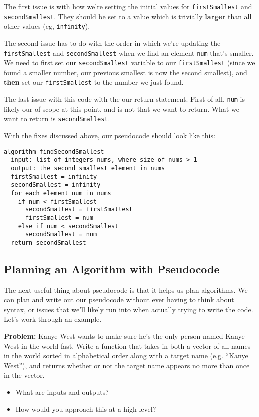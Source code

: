 \documentclass [12pt]{article}
\begin{document}
The first issue is with how we're setting the initial values for \texttt{firstSmallest} and \texttt{secondSmallest}. They should be set to a value which is trivially \textbf{larger} than all other values (eg, \texttt{infinity}).

The second issue has to do with the order in which we're updating the \texttt{firstSmallest} and \texttt{secondSmallest} when we find an element \texttt{num} that's smaller. We need to first set our \texttt{secondSmallest} variable to our \texttt{firstSmallest} (since we found a smaller number, our previous smallest is now the second smallest), and \textbf{then} set our \texttt{firstSmallest} to the number we just found.

The last issue with this code with the our return statement. First of all, \texttt{num} is likely our of scope at this point, and is not that we want to return. What we want to return is \texttt{secondSmallest}.

With the fixes discussed above, our pseudocode should look like this:

\begin{verbatim}
algorithm findSecondSmallest
  input: list of integers nums, where size of nums > 1
  output: the second smallest element in nums
  firstSmallest = infinity
  secondSmallest = infinity
  for each element num in nums
    if num < firstSmallest
      secondSmallest = firstSmallest
      firstSmallest = num
    else if num < secondSmallest
      secondSmallest = num
  return secondSmallest
\end{verbatim}

\subsection{Planning an Algorithm with Pseudocode}

The next useful thing about pseudocode is that it helps us plan algorithms. We can plan and write out our pseudocode without ever having to think about syntax, or issues that we'll likely run into when actually trying to write the code. Let's work through an example.


\textbf{Problem:} Kanye West wants to make sure he’s the only person named Kanye West in the world fast. Write a function that takes in both a vector of all names in the world sorted in alphabetical order along with a target name (e.g. “Kanye West”), and returns whether or not the target name appears no more than once in the vector.

\begin{itemize}
    \item What are inputs and outputs?
    \item How would you approach this at a high-level?
\end{itemize}
\end{document}
